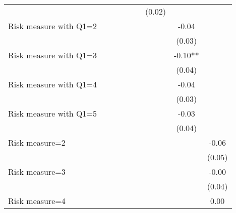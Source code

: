 \begin{table}[htbp]
\begin{threeparttable}
\begin{tabular}{l cccccccc}
                    &               &               &               &               &               &      (0.02)   &               &               \\
Risk measure with Q1=2&               &               &               &               &               &               &       -0.04   &               \\
                    &               &               &               &               &               &               &      (0.03)   &               \\
Risk measure with Q1=3&               &               &               &               &               &               &       -0.10** &               \\
                    &               &               &               &               &               &               &      (0.04)   &               \\
Risk measure with Q1=4&               &               &               &               &               &               &       -0.04   &               \\
                    &               &               &               &               &               &               &      (0.03)   &               \\
Risk measure with Q1=5&               &               &               &               &               &               &       -0.03   &               \\
                    &               &               &               &               &               &               &      (0.04)   &               \\
Risk measure=2      &               &               &               &               &               &               &               &       -0.06   \\
                    &               &               &               &               &               &               &               &      (0.05)   \\
Risk measure=3      &               &               &               &               &               &               &               &       -0.00   \\
                    &               &               &               &               &               &               &               &      (0.04)   \\
Risk measure=4      &               &               &               &               &               &               &               &        0.00   \\

\end{tabular}
\end{threeparttable}
\end{table}
